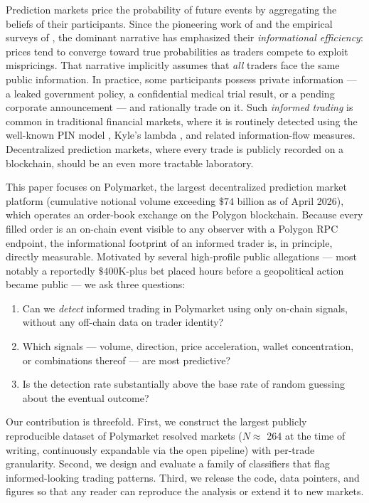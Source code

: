 \documentclass[11pt]{article}
\begin{document}
Prediction markets price the probability of future events by aggregating
the beliefs of their participants. Since the pioneering work of
\citet{hanson2003combinatorial} and the empirical surveys of
\citet{wolfers2004prediction}, the dominant narrative has emphasized their
\emph{informational efficiency}: prices tend to converge toward true
probabilities as traders compete to exploit mispricings. That narrative
implicitly assumes that \emph{all} traders face the same public information.
In practice, some participants possess private information --- a leaked
government policy, a confidential medical trial result, or a pending
corporate announcement --- and rationally trade on it. Such
\emph{informed trading} is common in traditional financial markets,
where it is routinely detected using the well-known PIN model
\citep{easley1996liquidity}, Kyle's lambda \citep{kyle1985continuous}, and
related information-flow measures. Decentralized prediction markets, where
every trade is publicly recorded on a blockchain, should be an even more
tractable laboratory.

This paper focuses on Polymarket, the largest decentralized prediction
market platform (cumulative notional volume exceeding $\$74$ billion as of
April 2026), which operates an order-book exchange on the Polygon
blockchain. Because every filled order is an on-chain event visible to
any observer with a Polygon RPC endpoint, the informational footprint of
an informed trader is, in principle, directly measurable. Motivated by
several high-profile public allegations --- most notably a reportedly
$\$400$K-plus bet placed hours before a geopolitical action became public
--- we ask three questions:

\begin{enumerate}
  \item Can we \emph{detect} informed trading in Polymarket using only
    on-chain signals, without any off-chain data on trader identity?
  \item Which signals --- volume, direction, price acceleration, wallet
    concentration, or combinations thereof --- are most predictive?
  \item Is the detection rate substantially above the base rate of
    random guessing about the eventual outcome?
\end{enumerate}

Our contribution is threefold. First, we construct the largest publicly
reproducible dataset of Polymarket resolved markets ($N \approx $ 264 at the
time of writing, continuously expandable via the open pipeline) with
per-trade granularity. Second, we design and evaluate a family of
classifiers that flag informed-looking trading patterns. Third, we release
the code, data pointers, and figures so that any reader can reproduce the
analysis or extend it to new markets.
\end{document}
